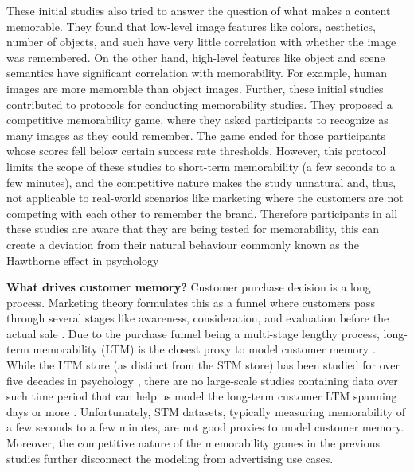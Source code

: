 These initial studies also tried to answer the question of what makes a content memorable. They found that low-level image features like colors, aesthetics, number of objects, and such have very little correlation with whether the image was remembered. On the other hand, high-level features like object and scene semantics have significant correlation with memorability. For example, human images are more memorable than object images. %
Further, these initial studies contributed to protocols for conducting memorability studies. They proposed a competitive memorability game, where they asked participants to recognize as many images as they could remember. The game ended for those participants whose scores fell below certain success rate thresholds. However, this protocol limits the scope of these studies to short-term memorability (a few seconds to a few minutes), and the competitive nature makes the study unnatural and, thus, not applicable to real-world scenarios like marketing where the customers are not competing with each other to remember the brand. Therefore participants in all these studies are aware that they are being tested for memorability, this can create a deviation from their natural behaviour commonly known as the Hawthorne effect in psychology \cite{mccarney2007hawthorne,roethlisberger2003management,malavolta2022awareness} 


\noindent\textbf{What drives customer memory?} Customer purchase decision is a long process. Marketing theory formulates this as a funnel where customers pass through several stages like awareness, consideration, and evaluation before the actual sale \cite{lavidge1961model}. Due to the purchase funnel being a multi-stage lengthy process, long-term memorability (LTM) is the closest proxy to model customer memory \cite{norris2017short,waugh1965primary}. While the LTM store (as distinct from the STM store) has been studied for over five decades in psychology \cite{ebbinghaus1885gedachtnis,atkinson1968human}, there are no large-scale studies containing data over such time period that can help us model the long-term customer LTM spanning days or more \cite{norris2017short,waugh1965primary}. Unfortunately, STM datasets, typically measuring memorability of a few seconds to a few minutes, are not good proxies to model customer memory. Moreover, the competitive nature of the memorability games in the previous studies further disconnect the modeling from advertising use cases. 

